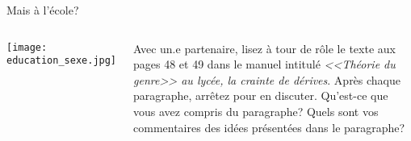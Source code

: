 \begin{frame}{Mais à l'école?}
  \begin{columns}
      \begin{center}
        \texttt{[image: education\_sexe.jpg]}
      \end{center}
      Avec un.e partenaire, lisez à tour de rôle le texte aux pages 48 et 49 dans le manuel intitulé \emph{<<Théorie du genre>> au lycée, la crainte de dérives}.
      Après chaque paragraphe, arrêtez pour en discuter.
      Qu'est-ce que vous avez compris du paragraphe?
      Quels sont vos commentaires des idées présentées dans le paragraphe?
  \end{columns}
\end{frame}